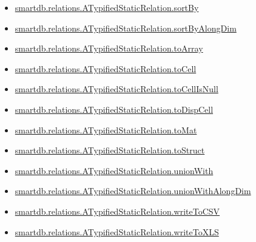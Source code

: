 \documentclass[letterpaper,10pt,english]{sphinxmanual}
\begin{document}
\begin{itemize}
\item {} 
{\hyperref[chap_func:smartdb-relations-atypifiedstaticrelation-sortby]{smartdb.relations.ATypifiedStaticRelation.sortBy}}

\item {} 
{\hyperref[chap_func:smartdb-relations-atypifiedstaticrelation-sortbyalongdim]{smartdb.relations.ATypifiedStaticRelation.sortByAlongDim}}

\item {} 
{\hyperref[chap_func:smartdb-relations-atypifiedstaticrelation-toarray]{smartdb.relations.ATypifiedStaticRelation.toArray}}

\item {} 
{\hyperref[chap_func:smartdb-relations-atypifiedstaticrelation-tocell]{smartdb.relations.ATypifiedStaticRelation.toCell}}

\item {} 
{\hyperref[chap_func:smartdb-relations-atypifiedstaticrelation-tocellisnull]{smartdb.relations.ATypifiedStaticRelation.toCellIsNull}}

\item {} 
{\hyperref[chap_func:smartdb-relations-atypifiedstaticrelation-todispcell]{smartdb.relations.ATypifiedStaticRelation.toDispCell}}

\item {} 
{\hyperref[chap_func:smartdb-relations-atypifiedstaticrelation-tomat]{smartdb.relations.ATypifiedStaticRelation.toMat}}

\item {} 
{\hyperref[chap_func:smartdb-relations-atypifiedstaticrelation-tostruct]{smartdb.relations.ATypifiedStaticRelation.toStruct}}

\item {} 
{\hyperref[chap_func:smartdb-relations-atypifiedstaticrelation-unionwith]{smartdb.relations.ATypifiedStaticRelation.unionWith}}

\item {} 
{\hyperref[chap_func:smartdb-relations-atypifiedstaticrelation-unionwithalongdim]{smartdb.relations.ATypifiedStaticRelation.unionWithAlongDim}}

\item {} 
{\hyperref[chap_func:smartdb-relations-atypifiedstaticrelation-writetocsv]{smartdb.relations.ATypifiedStaticRelation.writeToCSV}}

\item {} 
{\hyperref[chap_func:smartdb-relations-atypifiedstaticrelation-writetoxls]{smartdb.relations.ATypifiedStaticRelation.writeToXLS}}

\end{itemize}
\end{document}
